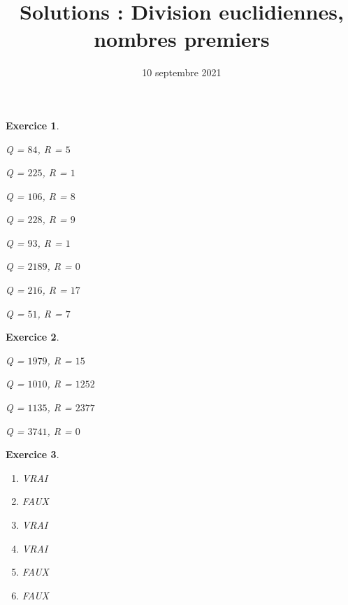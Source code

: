 \documentclass[a4paper]{article}
\title{Solutions : Division euclidiennes, nombres premiers}
\date{10 septembre 2021}
\theoremstyle{exostyle}
\newtheorem{exercice}{Exercice}
\begin{document}
\maketitle

\begin{exercice}
	\begin{enumerate}
		\begin{minipage}{0.45\linewidth}
			\item Q = $84$, R = $5$
			\item Q = $225$, R = $1$
			\item Q = $106$, R = $8$
			\item Q = $228$, R = $9$
		\end{minipage}
		\begin{minipage}{0.45\linewidth}
			\item Q = $93$, R = $1$
			\item Q = $2189$, R = $0$
			\item Q = $216$, R = $17$
			\item Q = $51$, R = $7$
		\end{minipage}
	\end{enumerate}
\end{exercice}

\begin{exercice}
	\begin{enumerate}
		\begin{minipage}{0.45\linewidth}
			\item Q = $1979$, R = $15$
			\item Q = $1010$, R = $1252$
		\end{minipage}
		\begin{minipage}{0.45\linewidth}
			\item Q = $1135$, R = $2377$
			\item Q = $3741$, R = $0$
		\end{minipage}
	\end{enumerate}
\end{exercice}

\begin{exercice}
	\begin{enumerate}
		\item VRAI
		\item FAUX
		\item VRAI
		\item VRAI
		\item FAUX
		\item FAUX
	\end{enumerate}
\end{exercice}
\end{document}
